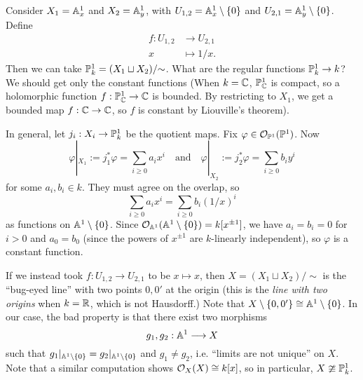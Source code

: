 \begin{example}\label{ex:projective-bug-eyed-line}
  Consider $X_1 = \mathbb{A}^1_x$
  and $X_2 = \mathbb{A}^1_y$, with
  $U_{1, 2} = \mathbb{A}^1_x \setminus \{0\}$
  and $U_{2, 1} = \mathbb{A}^1_y \setminus \{0\}$. Define
  \begin{align*}
    f : U_{1, 2}
    &\longrightarrow U_{2, 1} \\
    x &\longmapsto 1 / x.
  \end{align*}
  Then we can
  take $\mathbb{P}^1_k = (X_1 \sqcup X_2) / {\sim}$.
  What are the regular functions
  $\mathbb{P}^1_k \to k$? We should
  get only the constant functions
  (When $k = \mathbb{C}$,
  $\mathbb{P}^1_{\mathbb{C}}$ is compact, so a
  holomorphic function $f : \mathbb{P}^1_{\mathbb{C}} \to \mathbb{C}$
  is bounded. By restricting to $X_1$,
  we get a bounded map
  $f : \mathbb{C} \to \mathbb{C}$, so $f$ is constant
  by Liouville's theorem).

  In general,  let $j_i : X_i \to \mathbb{P}^1_k$
  be the quotient maps. Fix
  $\varphi \in \mathcal{O}_{\mathbb{P}^1}(\mathbb{P}^1)$.
  Now
  \[
    \varphi|_{X_1} := j_1^* \varphi
    = \sum_{i \ge 0} a_i x^i \quad
    \text{and} \quad
    \varphi|_{X_2} := j_2^* \varphi
    = \sum_{i \ge 0} b_i y^i
  \]
  for some $a_i, b_i \in k$.
  They must agree on the overlap, so
  \[
    \sum_{i \ge 0} a_i x^i
    = \sum_{i \ge 0} b_i (1 / x)^i
  \]
  as functions on $\mathbb{A}^1 \setminus \{0\}$.
  Since $\mathcal{O}_{\mathbb{A}^1}(\mathbb{A}^1 \setminus \{0\}) = k[x^{\pm 1}]$,
  we have $a_i = b_i = 0$ for
  $i > 0$ and $a_0 = b_0$ (since
  the powers of $x^{\pm 1}$ are $k$-linearly
  independent), so
  $\varphi$ is a constant function.

  If we instead took
  $f : U_{1, 2} \to U_{2, 1}$ to be
  $x \mapsto x$, then
  $X = (X_1 \sqcup X_2) / {\sim}$
  is the ``bug-eyed line'' with
  two points $0, 0'$ at the origin (this is
  the \emph{line with two origins} when
  $k = \mathbb{R}$, which is not Hausdorff.)
  Note that $X \setminus \{0, 0'\} \cong \mathbb{A}^1 \setminus \{0\}$.
  In our case, the bad property is
  that there exist two morphisms
  \[
    g_1, g_2 : \mathbb{A}^1 \longrightarrow X
  \]
  such that $g_1|_{\mathbb{A}^1 \setminus \{0\}} = g_2|_{\mathbb{A}^1 \setminus \{0\}}$
  and $g_1 \ne g_2$, i.e.
  ``limits are not unique'' on $X$.
  Note that a similar computation shows
  $\mathcal{O}_X(X) \cong k[x]$, so in particular,
  $X \ncong \mathbb{P}^1_k$.
\end{example}
